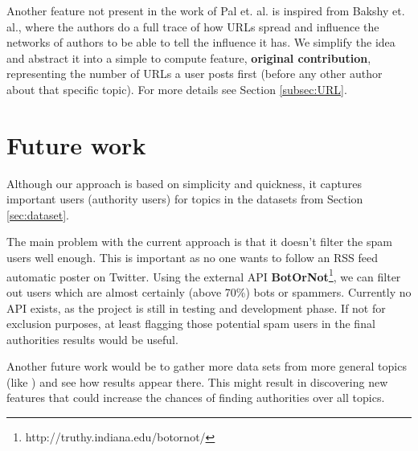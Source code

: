 Another feature not present in the work of Pal et. al.\cite{microblogs} is inspired from Bakshy et. al.\cite{bakshy}, where the authors do a full trace of how URLs spread and influence the networks of authors to be able to tell the influence it has. We simplify the idea and abstract it into a simple to compute feature, \textbf{original contribution}, representing the number of URLs a user posts first (before any other author about that specific topic). For more details see Section \ref{subsec:URL}.


\section{Future work}

Although our approach is based on simplicity and quickness, it captures important users (authority users) for topics in the datasets from Section \ref{sec:dataset}.

The main problem with the current approach is that it doesn't filter the spam users well enough. This is important as no one wants to follow an RSS feed automatic poster on Twitter. Using the external API \textbf{BotOrNot}\footnote{http://truthy.indiana.edu/botornot/}, we can filter out users which are almost certainly (above 70\%) bots or spammers. Currently no API exists, as the project is still in testing and development phase. If not for exclusion purposes, at least flagging those potential spam users in the final authorities results would be useful.

Another future work would be to gather more data sets from more general topics (like ) and see how results appear there. This might result in discovering new features that could increase the chances of finding authorities over all topics.